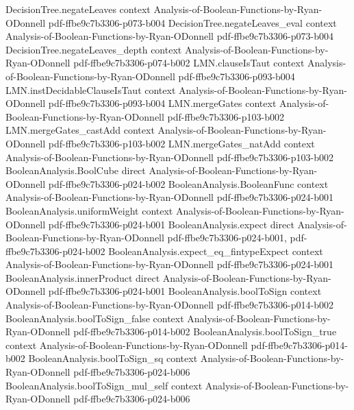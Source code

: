 \begin{theorem}
\proofstep
  {DecisionTree.negateLeaves}
  {context}
  {Analysis-of-Boolean-Functions-by-Ryan-ODonnell}
  {pdf-ffbe9c7b3306-p073-b004}
\proofstep
  {DecisionTree.negateLeaves_eval}
  {context}
  {Analysis-of-Boolean-Functions-by-Ryan-ODonnell}
  {pdf-ffbe9c7b3306-p073-b004}
\proofstep
  {DecisionTree.negateLeaves_depth}
  {context}
  {Analysis-of-Boolean-Functions-by-Ryan-ODonnell}
  {pdf-ffbe9c7b3306-p074-b002}
\proofstep
  {LMN.clauseIsTaut}
  {context}
  {Analysis-of-Boolean-Functions-by-Ryan-ODonnell}
  {pdf-ffbe9c7b3306-p093-b004}
\proofstep
  {LMN.instDecidableClauseIsTaut}
  {context}
  {Analysis-of-Boolean-Functions-by-Ryan-ODonnell}
  {pdf-ffbe9c7b3306-p093-b004}
\proofstep
  {LMN.mergeGates}
  {context}
  {Analysis-of-Boolean-Functions-by-Ryan-ODonnell}
  {pdf-ffbe9c7b3306-p103-b002}
\proofstep
  {LMN.mergeGates_castAdd}
  {context}
  {Analysis-of-Boolean-Functions-by-Ryan-ODonnell}
  {pdf-ffbe9c7b3306-p103-b002}
\proofstep
  {LMN.mergeGates_natAdd}
  {context}
  {Analysis-of-Boolean-Functions-by-Ryan-ODonnell}
  {pdf-ffbe9c7b3306-p103-b002}
\proofstep
  {BooleanAnalysis.BoolCube}
  {direct}
  {Analysis-of-Boolean-Functions-by-Ryan-ODonnell}
  {pdf-ffbe9c7b3306-p024-b002}
\proofstep
  {BooleanAnalysis.BooleanFunc}
  {context}
  {Analysis-of-Boolean-Functions-by-Ryan-ODonnell}
  {pdf-ffbe9c7b3306-p024-b001}
\proofstep
  {BooleanAnalysis.uniformWeight}
  {context}
  {Analysis-of-Boolean-Functions-by-Ryan-ODonnell}
  {pdf-ffbe9c7b3306-p024-b001}
\proofstep
  {BooleanAnalysis.expect}
  {direct}
  {Analysis-of-Boolean-Functions-by-Ryan-ODonnell}
  {pdf-ffbe9c7b3306-p024-b001,
    pdf-ffbe9c7b3306-p024-b002}
\proofstep
  {BooleanAnalysis.expect_eq_fintypeExpect}
  {context}
  {Analysis-of-Boolean-Functions-by-Ryan-ODonnell}
  {pdf-ffbe9c7b3306-p024-b001}
\proofstep
  {BooleanAnalysis.innerProduct}
  {direct}
  {Analysis-of-Boolean-Functions-by-Ryan-ODonnell}
  {pdf-ffbe9c7b3306-p024-b001}
\proofstep
  {BooleanAnalysis.boolToSign}
  {context}
  {Analysis-of-Boolean-Functions-by-Ryan-ODonnell}
  {pdf-ffbe9c7b3306-p014-b002}
\proofstep
  {BooleanAnalysis.boolToSign_false}
  {context}
  {Analysis-of-Boolean-Functions-by-Ryan-ODonnell}
  {pdf-ffbe9c7b3306-p014-b002}
\proofstep
  {BooleanAnalysis.boolToSign_true}
  {context}
  {Analysis-of-Boolean-Functions-by-Ryan-ODonnell}
  {pdf-ffbe9c7b3306-p014-b002}
\proofstep
  {BooleanAnalysis.boolToSign_sq}
  {context}
  {Analysis-of-Boolean-Functions-by-Ryan-ODonnell}
  {pdf-ffbe9c7b3306-p024-b006}
\proofstep
  {BooleanAnalysis.boolToSign_mul_self}
  {context}
  {Analysis-of-Boolean-Functions-by-Ryan-ODonnell}
  {pdf-ffbe9c7b3306-p024-b006}

\end{theorem}
